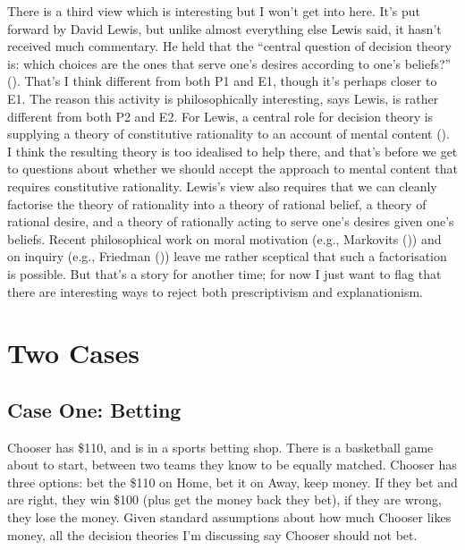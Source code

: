 \documentclass[
  11pt,
  letterpaper,
  DIV=11,
  numbers=noendperiod,
  twoside]{scrartcl}
\begin{document}
There is a third view which is interesting but I won't get into here.
It's put forward by David Lewis, but unlike almost everything else Lewis
said, it hasn't received much commentary. He held that the ``central
question of decision theory is: which choices are the ones that serve
one's desires according to one's beliefs?''
().
That's I think different from both P1 and E1, though it's perhaps closer
to E1. The reason this activity is philosophically interesting, says
Lewis, is rather different from both P2 and E2. For Lewis, a central
role for decision theory is supplying a theory of constitutive
rationality to an account of mental content
(). I think the resulting
theory is too idealised to help there, and that's before we get to
questions about whether we should accept the approach to mental content
that requires constitutive rationality. Lewis's view also requires that
we can cleanly factorise the theory of rationality into a theory of
rational belief, a theory of rational desire, and a theory of rationally
acting to serve one's desires given one's beliefs. Recent philosophical
work on moral motivation (e.g., Markovits
()) and on inquiry (e.g., Friedman
()) leave me rather sceptical that such
a factorisation is possible. But that's a story for another time; for
now I just want to flag that there are interesting ways to reject both
prescriptivism and explanationism.

\section{Two Cases}\label{sec-two-cases}

\subsection{Case One: Betting}\label{case-one-betting}

Chooser has \$110, and is in a sports betting shop. There is a
basketball game about to start, between two teams they know to be
equally matched. Chooser has three options: bet the \$110 on Home, bet
it on Away, keep money. If they bet and are right, they win \$100 (plus
get the money back they bet), if they are wrong, they lose the money.
Given standard assumptions about how much Chooser likes money, all the
decision theories I'm discussing say Chooser should not bet.
\end{document}
